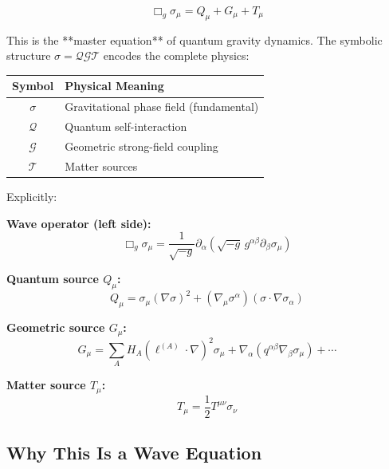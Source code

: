 \documentclass[11pt,a4paper]{article}
\theoremstyle{definition}
\theoremstyle{remark}
\begin{document}
		\begin{equation}\label{eq:master_sigma_QGT}
			\boxed{\Box_g\sigma_\mu = Q_\mu + G_\mu + T_\mu}
		\end{equation}
		
		This is the **master equation** of quantum gravity dynamics. The symbolic structure $\sigma = \mathcal{Q}\mathcal{G}\mathcal{T}$ encodes the complete physics:
		
		\begin{center}
			\begin{tabular}{cl}
				\hline
				\textbf{Symbol} & \textbf{Physical Meaning}\\
				\hline
				$\sigma$ & Gravitational phase field (fundamental)\\
				$\mathcal{Q}$ & Quantum self-interaction\\
				$\mathcal{G}$ & Geometric strong-field coupling\\
				$\mathcal{T}$ & Matter sources\\
				\hline
			\end{tabular}
		\end{center}
		
		Explicitly:
		
		\textbf{Wave operator (left side):}
		\begin{equation}
			\Box_g\sigma_\mu = \frac{1}{\sqrt{-g}}\partial_\alpha\left(\sqrt{-g}\,g^{\alpha\beta}\partial_\beta\sigma_\mu\right)
		\end{equation}
		
		\textbf{Quantum source $Q_\mu$:}
		\begin{equation}
			Q_\mu = \sigma_\mu(\nabla\sigma)^2 + (\nabla_\mu\sigma^\alpha)(\sigma \cdot \nabla\sigma_\alpha)
		\end{equation}
		
		\textbf{Geometric source $G_\mu$:}
		\begin{equation}
			G_\mu = \sum_A H_A(\ell^{(A)} \cdot \nabla)^2\sigma_\mu + \nabla_\alpha(q^{\alpha\beta}\nabla_\beta\sigma_\mu) + \cdots
		\end{equation}
		
		\textbf{Matter source $T_\mu$:}
		\begin{equation}
			T_\mu = \frac{1}{2}T^{\mu\nu}\sigma_\nu
		\end{equation}
		
		\subsection{Why This Is a Wave Equation}
		
\end{document}
